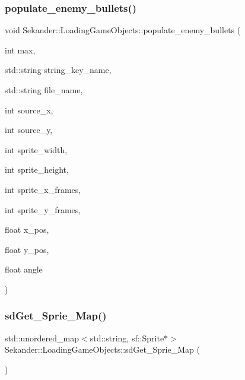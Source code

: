 \subsubsection{\texorpdfstring{populate\+\_\+enemy\+\_\+bullets()}{populate\_enemy\_bullets()}}
{\footnotesize\ttfamily void Sekander\+::\+Loading\+Game\+Objects\+::populate\+\_\+enemy\+\_\+bullets (\begin{DoxyParamCaption}\item[{int}]{max,  }\item[{std\+::string}]{string\+\_\+key\+\_\+name,  }\item[{std\+::string}]{file\+\_\+name,  }\item[{int}]{source\+\_\+x,  }\item[{int}]{source\+\_\+y,  }\item[{int}]{sprite\+\_\+width,  }\item[{int}]{sprite\+\_\+height,  }\item[{int}]{sprite\+\_\+x\+\_\+frames,  }\item[{int}]{sprite\+\_\+y\+\_\+frames,  }\item[{float}]{x\+\_\+pos,  }\item[{float}]{y\+\_\+pos,  }\item[{float}]{angle }\end{DoxyParamCaption})\hspace{0.3cm}{\ttfamily [inline]}}

\mbox{\label{classSekander_1_1LoadingGameObjects_a58857b9a3697137ddf9ad7c161f84fd6}} 
\subsubsection{\texorpdfstring{sd\+Get\+\_\+\+Sprie\+\_\+\+Map()}{sdGet\_Sprie\_Map()}}
{\footnotesize\ttfamily std\+::unordered\+\_\+map$<$std\+::string, sf\+::\+Sprite$\ast$$>$ Sekander\+::\+Loading\+Game\+Objects\+::sd\+Get\+\_\+\+Sprie\+\_\+\+Map (\begin{DoxyParamCaption}{ }\end{DoxyParamCaption})\hspace{0.3cm}{\ttfamily [inline]}}

